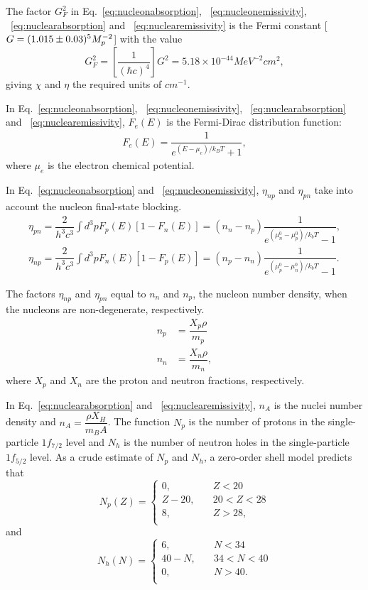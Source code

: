 \documentclass[10pt,preprint]{aastex}
\begin{document}
The factor $G^2_F$ in Eq.~\eqref{eq:nucleonabsorption}, ~\eqref{eq:nucleonemissivity}, ~\eqref{eq:nuclearabsorption} and ~\eqref{eq:nuclearemissivity} is the Fermi constant [$G=(1.015\pm 0.03)\time 10^5 M_p^{-2}$] with the value
\begin{equation}
G^2_F = \left[ \dfrac{1}{(\hbar c)^4} \right] G^2 = 5.18 \times 10^{-44} MeV^{-2}cm^2, 
\end{equation}
giving $\chi$ and $\eta$ the required units of $cm^{-1}$.

In Eq.~\eqref{eq:nucleonabsorption}, ~\eqref{eq:nucleonemissivity}, ~\eqref{eq:nuclearabsorption} and ~\eqref{eq:nuclearemissivity}, $F_e(E)$ is the Fermi-Dirac distribution function:
\begin{align}
F_e(E) = \dfrac{1}{e^{(E-\mu_e)/k_B T} + 1},
\end{align}
where $\mu_e$ is the electron chemical potential.

In Eq.~\eqref{eq:nucleonabsorption} and ~\eqref{eq:nucleonemissivity}, $\eta_{np}$ and $\eta_{pn}$ take into account the nucleon final-state blocking. 
\begin{align}
\eta_{pn} = \dfrac{2}{h^3 c^3} \int d^3 p F_p (E)[1-F_n(E)] = (n_n - n_p) \dfrac{1}{e^{(\mu_n^0 - \mu_p^0)/k_bT}-1},\\
\eta_{np} = \dfrac{2}{h^3 c^3} \int d^3 p F_n (E)[1-F_p(E)] = (n_p - n_n) \dfrac{1}{e^{(\mu_p^0 - \mu_n^0)/k_bT}-1}.
\end{align}

The factors $\eta_{np}$ and $\eta_{pn}$ equal to $n_n$ and $n_p$, the nucleon number density, when the nucleons are non-degenerate, respectively.
\begin{align}
n_p & =  \dfrac{X_p \rho}{m_p} \\
n_n & =  \dfrac{X_n \rho}{m_n},
\end{align}
where $X_p$ and $X_n$ are the proton and neutron fractions, respectively.

In Eq.~\eqref{eq:nuclearabsorption} and ~\eqref{eq:nuclearemissivity}, $n_A$ is the nuclei number density and $n_A = \dfrac{\rho X_H}{m_B A}$. The function $N_p$ is the number of protons in the single-particle $1f_{7/2}$ level and $N_h$ is the number of neutron holes in the single-particle $1f_{5/2}$ level. As a crude estimate of $N_p$ and $N_h$, a zero-order shell model predicts that
\[   
N_p(Z) = 
     \begin{cases}
       0, &\quad Z<20\\
       Z-20, &\quad 20<Z<28 \\
       8, &\quad Z>28,\\
     \end{cases}
\]
and
\[   
N_h(N) = 
     \begin{cases}
       6, &\quad N<34\\
       40-N, &\quad 34<N<40 \\
       0, &\quad N>40.\\
     \end{cases}
\]
\end{document}

